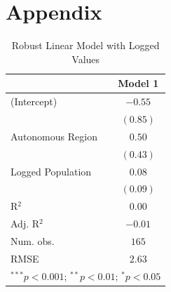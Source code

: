 \documentclass[12pt]{elsarticle}
\begin{document}





\nocite{*}



\section{Appendix}
\begin{table}[htp]
\begin{center}
\begin{tabular}{l c}
\hline
 & Model 1 \\
\hline
(Intercept)         & $-0.55$  \\
                    & $(0.85)$ \\
Autonomous Region   & $0.50$   \\
                    & $(0.43)$ \\
Logged Population   & $0.08$   \\
                    & $(0.09)$ \\
\hline
R$^2$               & $0.00$   \\
Adj. R$^2$          & $-0.01$  \\
Num. obs.           & $165$    \\
RMSE                & $2.63$   \\
\hline
\multicolumn{2}{l}{\scriptsize{$^{***}p<0.001$; $^{**}p<0.01$; $^{*}p<0.05$}}
\end{tabular}
\caption{Robust Linear Model with Logged Values}
\end{center}
\end{table}




\end{document}
